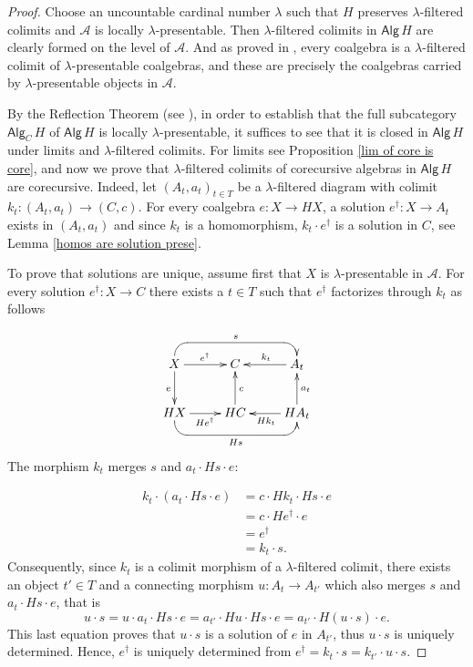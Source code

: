\documentclass{LMCS}
\theoremstyle{plain}
\theoremstyle{definition}
\numberwithin{equation}{section}
\begin{document}
\begin{proof}
Choose an uncountable cardinal number $\lambda$ such that $H$ preserves $\lambda$-filtered colimits and $\mathcal A$ is locally $\lambda$-presentable. Then $\lambda$-filtered colimits in $\mathsf{Alg}\,  H$ are clearly formed on the level of $\mathcal A$. And as proved in \cite{ap}, every coalgebra is a $\lambda$-filtered colimit of $\lambda$-presentable coalgebras, and these are precisely the coalgebras carried by $\lambda$-presentable objects in $\mathcal A$.

By the Reflection Theorem (see \cite[Corollary to Theorem 2.48]{ar}), in order to establish that the full subcategory $\mathsf{Alg}_C\, H$ of $\mathsf{Alg}\, H$ is locally $\lambda$-presentable, it suffices to see that it is closed in $\mathsf{Alg}\, H$ under limits and $\lambda$-filtered colimits. For limits see Proposition  \ref{lim of core is core}, and now we prove that $\lambda$-filtered colimits of corecursive algebras in $\mathsf{Alg}\, H$ are corecursive. Indeed, let $(A_t, a_t)_{t\in T}$ be a $\lambda$-filtered diagram with colimit $k_t:(A_t,a_t)\rightarrow (C,c)$. For every coalgebra $e:X\rightarrow HX$, a solution $e^\dagger:X\rightarrow A_t$ exists in $(A_t,a_t)$ and since $k_t$ is a homomorphism, $k_t\cdot e^\dagger$ is a solution in $C$, see Lemma \ref{homos are solution prese}.

To prove that solutions are unique, assume first that $X$ is $\lambda$-presentable in $\mathcal A$. For every solution $e^\dagger:X\rightarrow C$ there exists a $t\in T$ such that $e^\dagger$ factorizes through $k_t$ as follows

$$
\xymatrix{
X\ar[r]^{e^\dagger}\ar[d]_e&C&A_t\ar[l]_{k_t}\ar@{<-}`u[l]`[ll]_-s[ll]\\
HX\ar[r]_{He^\dagger}&HC\ar[u]_c&HA_t\ar[u]_{a_t}\ar[l]^{Hk_t}\ar@{<-}`d[l]`[ll]^-{Hs}[ll]\\
}
$$
The morphism $k_t$ merges $s$ and $a_t\cdot Hs \cdot e$:

\begin{align*}
k_t\cdot(a_t\cdot Hs\cdot e)&=c\cdot Hk_t\cdot Hs\cdot e\\
&=c\cdot He^\dagger \cdot e\\
&=e^\dagger \\
&=k_t\cdot s.
\end{align*}
Consequently, since $k_t$ is a colimit morphism of a $\lambda$-filtered colimit, there exists an object $t'\in T$ and a connecting morphism $u:A_t\rightarrow A_{t'}$ which also merges $s$ and $a_t\cdot Hs\cdot e$, that is $$u\cdot s=u\cdot a_t\cdot Hs\cdot e=a_{t'}\cdot Hu\cdot Hs\cdot e = a_{t'} \cdot H(u\cdot s) \cdot e.$$
This last equation proves that $u\cdot s$ is a solution of $e$ in $A_{t'}$, thus $u\cdot s$ is uniquely determined. Hence, $e^\dagger $ is uniquely determined from $e^\dagger=k_t\cdot s=k_{t'}\cdot u\cdot s$.


\end{proof}
\end{document}
